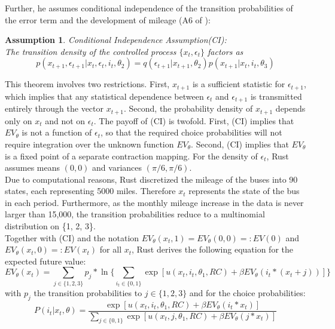 \documentclass[a4paper,12pt,bold]{scrartcl}
\newtheorem{Assumption}{Assumption}
\begin{document}
Further, he assumes conditional independence of the transition probabilities of the error term and the development of mileage (A6 of \cite{Rust.1988}):

\begin{Assumption}
Conditional Independence Assumption(CI):\\
The transition density of the controlled process \(\{x_t, \epsilon_t\}\) factors as
\begin{equation}
  p(x_{t+1}, \epsilon_{t+1} | x_t, \epsilon_t, i_t, \theta_2) = q(\epsilon_{t+1} | x_{t+1}, \theta_2) p(x_{t+1} | x_t, i_t, \theta_3)
\end{equation}
\end{Assumption}
This theorem involves two restrictions. First, \(x_{t+1}\) is a sufficient statistic for \(\epsilon_{t+1}\), which implies that any statistical dependence between \(\epsilon_t\) and \(\epsilon_{t+1}\) is transmitted entirely through the vector \(x_{t+1}\). Second, the probability density of \(x_{t+1}\) depends only on \(x_t\) and not on \(\epsilon_t\). The payoff of (CI) is twofold. First, (CI) implies that \(EV_{\theta}\) is not a function of \(\epsilon_t\), so that the required choice probabilities will not require integration over the unknown function \(EV_{\theta}\). Second, (CI) implies that \(EV_{\theta}\) is a fixed point of a separate contraction mapping. For the density of \(\epsilon_t\), Rust assumes means \((0,0)\) and variances \( ( \pi / 6, \pi / 6) \).\medskip \\
Due to computational reasons, Rust discretized the mileage of the buses into 90 states, each representing 5000 miles. Therefore $x_t$ represents the state of the bus in each period. Furthermore, as the monthly mileage increase in the data is never larger than 15,000, the transition probabilities reduce to a multinomial distribution on \{1, 2, 3\}.\\
Together with (CI) and the notation \(EV_{ \theta }( x_t, 1) = EV_{ \theta }( 0, 0) =: EV(0)\) and \(EV_{ \theta }( x_t, 0) =: EV(x_t)\) for all \(x_t\), Rust derives the following equation for the expected future value:
\begin{equation}
  EV_{\theta}(x_t) = \sum_{j \in \{1, 2, 3\}} p_j * \ln\{ \sum_{i_t \in \{0, 1\}} \exp[u(x_t, i_t, \theta_1, RC) + \beta EV_{\theta}(i_t * (x_t + j))]\}
\end{equation}
with \(p_j\) the transition probabilities to \(j \in \{1,2,3\}\) and for the choice probabilities:
\begin{equation}
P(i_t | x_t, \theta) = \frac{\exp[u(x_t, i_t, \theta_1, RC) + \beta EV_{\theta} (i_t * x_t)]}{ \sum_{j \in \{0, 1\}}\exp[u(x_t, j, \theta_1, RC) + \beta EV_{\theta} (j * x_t)]}
\end{equation}
\end{document}

